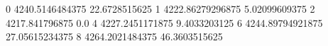 0 4240.5146484375 22.6728515625
1 4222.86279296875 5.02099609375
2 4217.841796875 0.0
4 4227.2451171875 9.4033203125
6 4244.89794921875 27.05615234375
8 4264.2021484375 46.3603515625
